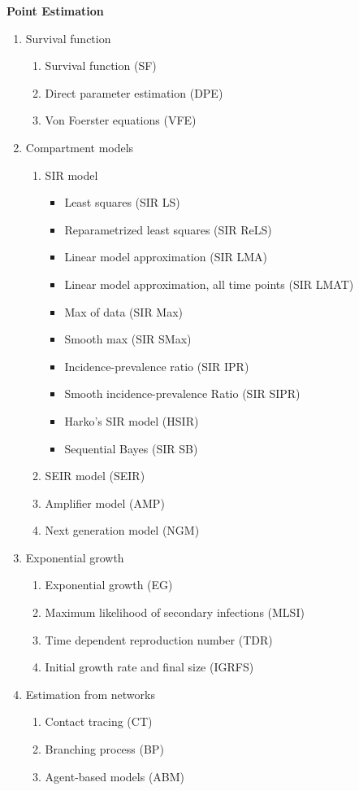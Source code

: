 \documentclass[12pt]{article}
\begin{document}
\textbf{Point Estimation}
\begin{enumerate}
\item Survival function
  \begin{enumerate}
  \item Survival function (SF)
  \item Direct parameter estimation (DPE)
  \item Von Foerster equations (VFE)

  \end{enumerate}
\item Compartment models 
  \begin{enumerate}
  \item SIR model
    \begin{itemize}
    \item Least squares (SIR LS)
    \item Reparametrized least squares (SIR ReLS)
    \item Linear model approximation (SIR LMA)
    \item Linear model approximation, all time points (SIR LMAT)
    \item Max of data (SIR Max)
    \item Smooth max (SIR SMax)
    \item Incidence-prevalence ratio (SIR IPR)
    \item Smooth incidence-prevalence Ratio (SIR SIPR)
    \item Harko's SIR model (HSIR)
    \item Sequential Bayes (SIR SB)
    \end{itemize}
  \item SEIR model (SEIR)
  \item Amplifier model (AMP)
  \item Next generation model (NGM)
  \end{enumerate}
\item Exponential growth 
  \begin{enumerate}
  \item Exponential growth (EG)
  \item Maximum likelihood of secondary infections (MLSI)
  \item Time dependent reproduction number (TDR)
  \item Initial growth rate and final size  (IGRFS)
  \end{enumerate}
\item Estimation from networks 
  \begin{enumerate}
  \item Contact tracing (CT)
  \item Branching process (BP)
  \item Agent-based models (ABM)
  \end{enumerate}
  \end{enumerate}
\end{document}

